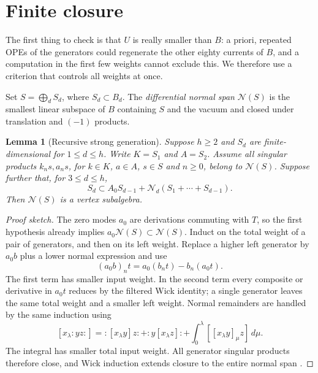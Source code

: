 \documentclass[11pt,a4paper]{article}
\newtheorem{lemma}[theorem]{Lemma}
\begin{document}
\section{Finite closure}\label{sec:closure}
The first thing to check is that $U$ is really smaller than $B$: a
priori, repeated OPEs of the generators could regenerate the other
eighty currents of $B$, and a computation in the first few weights
cannot exclude this. We therefore use a criterion that controls all
weights at once. 

Set $S=\bigoplus_d S_d$, where $S_d\subset B_d$.
The \emph{differential normal span} $\mathcal N(S)$ is the smallest
linear subspace of $B$ containing $S$ and the vacuum and closed
under translation and $(-1)$ products.

\begin{lemma}[Recursive strong generation]\label{lem:closure}
Suppose $h\ge2$ and $S_d$ are finite-dimensional for $1\le d\le h$. Write
$K=S_1$ and $A=S_2$. Assume all singular products
$k_ns,a_ns$, for $k\in K$, $a\in A$, $s\in S$ and $n\ge0$, belong
to $\mathcal N(S)$. Suppose further that, for $3\le d\le h$,
\begin{equation}\label{eq:recursive}
 S_d\subset A_0S_{d-1}+\mathcal N_d(S_1+\cdots+S_{d-1}).
\end{equation}
Then $\mathcal N(S)$ is a vertex subalgebra.
\end{lemma}
\begin{proof}[Proof sketch]
The zero modes $a_0$ are derivations commuting with $T$, so the first
hypothesis already implies $a_0\mathcal N(S)\subset\mathcal N(S)$.
Induct on the total weight of a pair of generators, and then on its
left weight. Replace a higher left generator by $a_0b$ plus a lower
normal expression and use
\begin{equation}\label{eq:Jacobi}
 (a_0b)_nt=a_0(b_nt)-b_n(a_0t).
\end{equation}
The first term has smaller input weight. In the second term every
composite or derivative in $a_0t$ reduces by the filtered Wick identity;
a single generator leaves the same total weight and a smaller left
weight. Normal remainders are handled by the same induction using
\[
 [x_\lambda:yz:]=:[x_\lambda y]z:+:y[x_\lambda z]:
                  +\int_0^\lambda[[x_\lambda y]_\mu z]\,d\mu.
\]
The integral has smaller total input weight. All generator singular
products therefore close, and Wick induction extends closure to the
entire normal span \cite{DSK}.
\end{proof}
\end{document}
